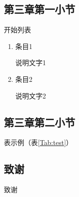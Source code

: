 \documentclass[twoside]{CUGThesis}
\begin{document}
	\subsection{第三章第一小节}
	开始列表
	\begin{enumerate}
		\item 条目1
		
		说明文字1
		
		\item 条目2
		
		说明文字2
		
		
	\end{enumerate}
	\subsection{第三章第二小节}
	表示例（表\ref{Tab:test}）
	\begin{table}[t]
		\centering
		\caption{表示例}
		\label{Tab:test}
		\vspace{10mm}
	\end{table}
	
	
	\begin{spacing}{2}
		\section*{致谢}
	\end{spacing}
	
	致谢
	
	\clearpage
	
	
	
\end{document}
